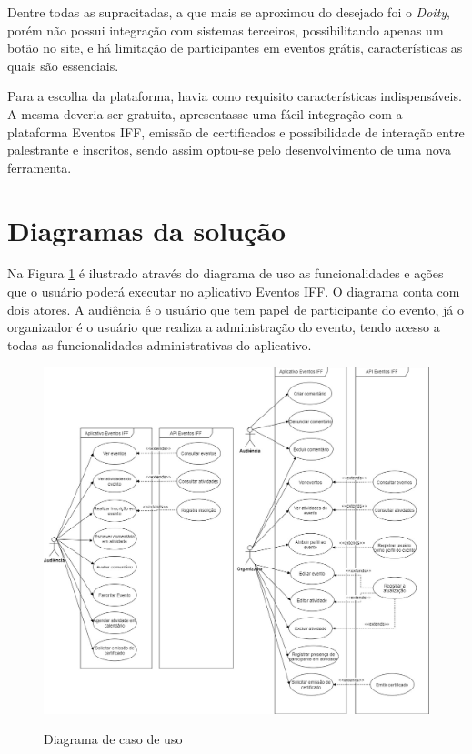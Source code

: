 Dentre todas as supracitadas, a que mais se aproximou do desejado foi o \textit{Doity}, porém não possui integração com sistemas terceiros, possibilitando apenas um botão no site, e há limitação de participantes em eventos grátis, características as quais são essenciais.

Para a escolha da plataforma, havia como requisito características indispensáveis. A mesma deveria ser gratuita, apresentasse uma fácil integração com a plataforma Eventos IFF, emissão de certificados e possibilidade de interação entre palestrante e inscritos, sendo assim optou-se pelo desenvolvimento de uma nova ferramenta.

\section{Diagramas da solução}

Na Figura \ref{fig:caso-de-uso} é ilustrado através do diagrama de uso as funcionalidades e ações que o usuário poderá executar no aplicativo Eventos IFF. O diagrama conta com dois atores. A audiência é o usuário que tem papel de participante do evento, já o organizador é o usuário que realiza a administração do evento, tendo acesso a todas as funcionalidades administrativas do aplicativo.

\begin{figure}[H]
    \centering
    \caption{Diagrama de caso de uso}
    \includegraphics[scale=0.37]{figuras/caso-de-uso.jpg}
    \label{fig:caso-de-uso}
\end{figure}

